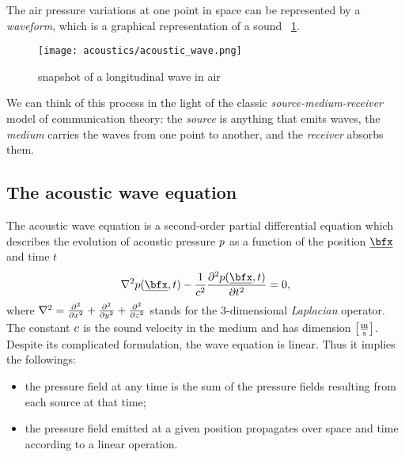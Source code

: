 The air pressure variations at one point in space can be represented by a \textit{waveform}, which is a graphical representation of a sound
~\cref{fig:acoustics:acoustics_wave}.
\begin{figure}[h]
    \centering
    \texttt{[image: acoustics/acoustic\_wave.png]}
    \caption{snapshot of a longitudinal wave in air}
    \label{fig:acoustics:acoustics_wave}
\end{figure}

We can think of this process in the light of the classic \textit{source-medium-receiver} model of communication theory:
the \textit{source} is anything that emits waves, the \textit{medium} carries the waves from one point to another, and the \textit{receiver} absorbs them.

\subsection{The acoustic wave equation}\label{subsec:acoustics:waveq}
The acoustic wave equation is a second-order partial differential equation which describes the evolution of acoustic pressure $\pressure$
as a function of the position $\positionMicrophone$ and time $t$
\begin{equation}
    \label{eq:acoustics:wave}
    \knabla^2 \pressureSpaceTime - \frac{1}{\speedOfSound^2} \kpderiv[2]{\pressureSpaceTime}{t} = 0
    ,
\end{equation}
where $\knabla^2 = \kpderiv[2]{}{x} + \kpderiv[2]{}{y} + \kpderiv[2]{}{z}$ stands for the 3-dimensional \textit{Laplacian} operator.
The constant $\speedOfSound$ is the sound velocity in the medium and has dimension $\kbracket{\frac{\si{\metre}}{\si{\second}}}$.
\\Despite its complicated formulation, the wave equation is linear. Thus it implies the followings:
\begin{itemize}
    \item the pressure field at any time is the sum of the pressure fields resulting from each source at that time;
    \item the pressure field emitted at a given position propagates over space and time according to a linear operation.
\end{itemize}

